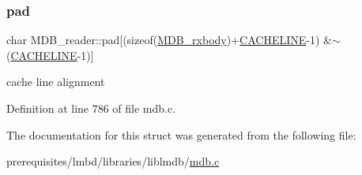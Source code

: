 \subsubsection{\texorpdfstring{pad}{pad}}
{\footnotesize\ttfamily char M\+D\+B\+\_\+reader\+::pad\mbox{[}(sizeof(\mbox{\hyperlink{struct_m_d_b__rxbody}{M\+D\+B\+\_\+rxbody}})+\mbox{\hyperlink{group__readers_gaa62717a1fae2c57f94f2a9b8ae08ec49}{C\+A\+C\+H\+E\+L\+I\+NE}}-\/1) \&$\sim$(\mbox{\hyperlink{group__readers_gaa62717a1fae2c57f94f2a9b8ae08ec49}{C\+A\+C\+H\+E\+L\+I\+NE}}-\/1)\mbox{]}}

cache line alignment 

Definition at line 786 of file mdb.\+c.



The documentation for this struct was generated from the following file\+:\begin{DoxyCompactItemize}
\item 
prerequisites/lmbd/libraries/liblmdb/\mbox{\hyperlink{mdb_8c}{mdb.\+c}}\end{DoxyCompactItemize}
